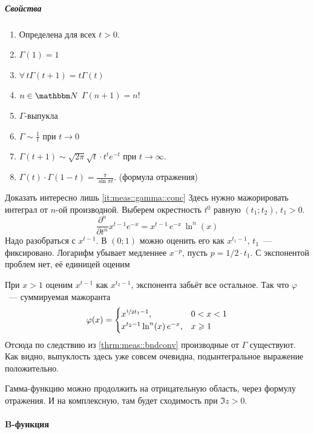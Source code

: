 \documentclass[draft, timbord]{longnotes}
\begin{document}
\subparagraph{Свойства}

\begin{enumerate}[$1^\circ$]
  \item Определена для всех $t>0$.
  \item $\Gamma (1) = 1$
  \item $\forall\, t \Gamma (t+1) = t \Gamma (t)$
  \item $n\in \N$ $\Gamma(n+1) = n!$
  \item\label{it:meas::gamma::conc} $\Gamma$-выпукла
  \item $\Gamma \sim \frac{1}{t} $ при $t\to 0$
  \item $\Gamma(t+1) \sim \sqrt{2\pi} \sqrt{t} \cdot t^t e^{-t}$ при $t\to \infty$.
  \item $\Gamma(t) \cdot \Gamma(1-t) = \frac{\pi}{\sin \pi t}$. (формула отражения)
\end{enumerate}
\begin{lproof}
  Доказать интересно лишь \ref{it:meas::gamma::conc}
  Здесь нужно мажорировать интеграл от $n$-ой производной. Выберем окрестность $t^0$
  равную $(t_1;t_2)$, $t_1 > 0$.
  \[
    \frac{\partial^n}{\partial t^n} x^{t-1} e^{-x} = x^{t-1}\, e^{-x}\, \ln ^n (x)
  \]
  Надо разобраться с $x^{t-1}$. В $(0;1)$ можно оценить его как $x^{t_1 -1}$, $t_1$~--- фиксировано.
  Логарифм убывает медленнее $x^{-p}$, пусть $p = 1/2 \cdot t_1$. С экспонентой 
  проблем нет, её единицей оценим

  При $x>1$ оценим $x^{t-1}$ как $x^{t_2-1}$, экспонента забьёт все остальное.
  Так что $\varphi$~--- суммируемая мажоранта
  \[
    \varphi(x) = 
    \begin{cases}
      x^{\nicefrac{1}{2} t_1 - 1},& 0 < x< 1 \\
      x^{t_2 - 1}\ln^n (x) \, e^{-x},& x \geqslant 1 \\
    \end{cases}
  \]
  Отсюда по следствию из \ref{thrm:meas::bndconv} производные от $\Gamma$ существуют.
  Как видно, выпуклость здесь уже совсем очевидна, подынтегральное выражение положительно.
\end{lproof}

Гамма-функцию можно продолжить на отрицательную область, через формулу отражения.
И на комплексную, там будет сходимость при $\Im z > 0$.

\paragraph{B-функция}
\label{par:meas::beta}
\end{document}
